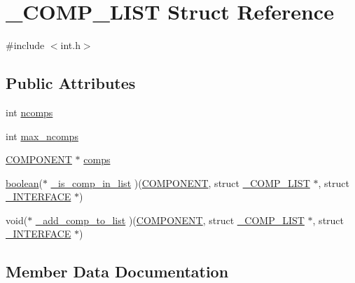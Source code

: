 \hypertarget{struct___c_o_m_p___l_i_s_t}{}\section{\+\_\+\+C\+O\+M\+P\+\_\+\+L\+I\+ST Struct Reference}
\label{struct___c_o_m_p___l_i_s_t}


{\ttfamily \#include $<$int.\+h$>$}

\subsection*{Public Attributes}
\begin{DoxyCompactItemize}
\item 
int \hyperlink{struct___c_o_m_p___l_i_s_t_a62d61d10e4eec562a3b6376467cd355d}{ncomps}
\item 
int \hyperlink{struct___c_o_m_p___l_i_s_t_a59348e0fd09ecf8befa6bc84defb8531}{max\+\_\+ncomps}
\item 
\hyperlink{int_8h_a2bb7be12ca59ea6443c8757df0a7c278}{C\+O\+M\+P\+O\+N\+E\+NT} $\ast$ \hyperlink{struct___c_o_m_p___l_i_s_t_ac19b249b7437b48489098e6b9f4b746b}{comps}
\item 
\hyperlink{cdecs_8h_ad048433382a936258fb49e2ec4f148e1}{boolean}($\ast$ \hyperlink{struct___c_o_m_p___l_i_s_t_a8e1cc3c857cbb2cfae450422bd75c5cd}{\+\_\+is\+\_\+comp\+\_\+in\+\_\+list} )(\hyperlink{int_8h_a2bb7be12ca59ea6443c8757df0a7c278}{C\+O\+M\+P\+O\+N\+E\+NT}, struct \hyperlink{struct___c_o_m_p___l_i_s_t}{\+\_\+\+C\+O\+M\+P\+\_\+\+L\+I\+ST} $\ast$, struct \hyperlink{int_8h_d0/d95/struct___i_n_t_e_r_f_a_c_e}{\+\_\+\+I\+N\+T\+E\+R\+F\+A\+CE} $\ast$)
\item 
void($\ast$ \hyperlink{struct___c_o_m_p___l_i_s_t_a55ae13dce7e9bb2949200c8e3cd0821b}{\+\_\+add\+\_\+comp\+\_\+to\+\_\+list} )(\hyperlink{int_8h_a2bb7be12ca59ea6443c8757df0a7c278}{C\+O\+M\+P\+O\+N\+E\+NT}, struct \hyperlink{struct___c_o_m_p___l_i_s_t}{\+\_\+\+C\+O\+M\+P\+\_\+\+L\+I\+ST} $\ast$, struct \hyperlink{int_8h_d0/d95/struct___i_n_t_e_r_f_a_c_e}{\+\_\+\+I\+N\+T\+E\+R\+F\+A\+CE} $\ast$)
\end{DoxyCompactItemize}


\subsection{Member Data Documentation}
